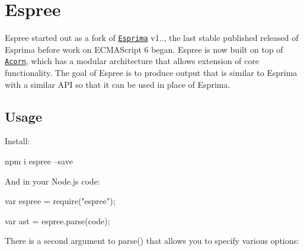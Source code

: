 \href{https://www.npmjs.com/package/espree}{\tt } \href{https://travis-ci.org/eslint/espree}{\tt } \href{https://www.npmjs.com/package/espree}{\tt } \href{https://www.bountysource.com/trackers/9348450-eslint?utm_source=9348450&utm_medium=shield&utm_campaign=TRACKER_BADGE}{\tt }

\section*{Espree}

Espree started out as a fork of \href{http://esprima.org}{\tt Esprima} v1.., the last stable published released of Esprima before work on E\+C\+M\+A\+Script 6 began. Espree is now built on top of \href{https://github.com/ternjs/acorn}{\tt Acorn}, which has a modular architecture that allows extension of core functionality. The goal of Espree is to produce output that is similar to Esprima with a similar A\+PI so that it can be used in place of Esprima.

\subsection*{Usage}

Install\+:


\begin{DoxyCode}
npm i espree --save
\end{DoxyCode}


And in your Node.\+js code\+:


\begin{DoxyCode}
var espree = require("espree");

var ast = espree.parse(code);
\end{DoxyCode}


There is a second argument to {\ttfamily parse()} that allows you to specify various options\+:


